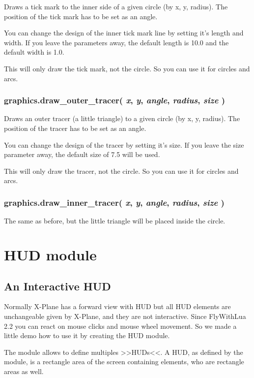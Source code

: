 \documentclass[11pt,parskip=half,a4paper]{scrartcl}
\begin{document}
Draws a tick mark to the inner side of a given circle (by x, y, radius). The position of the tick mark has to be set as an angle.

You can change the design of the inner tick mark line by setting it's length and width. If you leave the parameters away, the default length is 10.0 and the default width is 1.0.

This will only draw the tick mark, not the circle. So you can use it for circles and arcs.

\subsubsection{graphics.draw\_outer\_tracer( \emph{x}, \emph{y}, \emph{angle}, \emph{radius}, \emph{size} )}

Draws an outer tracer (a little triangle) to a given circle (by x, y, radius). The position of the tracer has to be set as an angle.

You can change the design of the tracer by setting it's size. If you leave the size parameter away, the default size of 7.5 will be used.

This will only draw the tracer, not the circle. So you can use it for circles and arcs.

\subsubsection{graphics.draw\_inner\_tracer( \emph{x}, \emph{y}, \emph{angle}, \emph{radius}, \emph{size} )}

The same as before, but the little triangle will be placed inside the circle.

\newpage
\section{HUD module}

\subsection{An Interactive HUD}

Normally X-Plane has a forward view with HUD but all HUD elements are unchangeable given by X-Plane, and they are not interactive. Since FlyWithLua 2.2 you can react on mouse clicks and mouse wheel movement. So we made a little demo how to use it by creating the HUD module.

The module allows to define multiples >>HUDs<<. A HUD, as defined by the module, is a rectangle area of the screen containing elements, who are rectangle areas as well.
\end{document}
